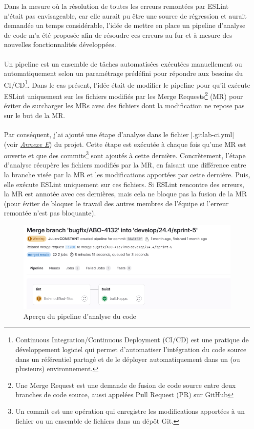 \documentclass[12pt, a4paper]{report}
\begin{document}
	\noindent
	Dans la mesure où la résolution de toutes les erreurs remontées par ESLint n'était pas envisageable, car elle aurait pu être une source de régression et aurait demandée un temps considérable, l'idée de mettre en place un pipeline d'analyse de code m'a été proposée afin de résoudre ces erreurs au fur et à mesure des nouvelles fonctionnalités développées.
	\\\\
	Un pipeline est un ensemble de tâches automatisées exécutées manuellement ou automatiquement selon un paramétrage prédéfini pour répondre aux besoins du CI/CD\footnote{Continuous Integration/Continuous Deployment (CI/CD) est une pratique de développement logiciel qui permet d'automatiser l'intégration du code source dans un référentiel partagé et de le déployer automatiquement dans un (ou plusieurs) environnement.}. Dans le cas présent, l'idée était de modifier le pipeline pour qu'il exécute ESLint uniquement sur les fichiers modifiés par les Merge Requests\footnote{Une Merge Request est une demande de fusion de code source entre deux branches de code source, aussi appelées Pull Request (PR) sur GitHub} (MR) pour éviter de surcharger les MRs avec des fichiers dont la modification ne repose pas sur le but de la MR.
	\\\\
	Par conséquent, j'ai ajouté une étape d'analyse dans le fichier \flqq{} \cverb|.gitlab-ci.yml| \frqq{} (voir \hyperref[sec:ci-cd_gitlab]{\it{Annexe E}}) du projet. Cette étape est exécutée à chaque fois qu'une MR est ouverte et que des commits\footnote{Un commit est une opération qui enregistre les modifications apportées à un fichier ou un ensemble de fichiers dans un dépôt Git.} sont ajoutés à cette dernière. Concrètement, l'étape d'analyse récupère les fichiers modifiés par la MR, en faisant une différence entre la branche visée par la MR et les modifications apportées par cette dernière. Puis,
  elle exécute ESLint uniquement sur ces fichiers. Si ESLint rencontre des erreurs, la MR est annotée avec ces dernières, mais cela ne bloque pas la fusion de la MR (pour éviter de bloquer le travail des autres membres de l'équipe si l'erreur remontée 
	n'est pas bloquante).
	\\
	
	\begin{figure}[!h]
		\centering
		\includegraphics[width=1\textwidth]{assets/images/lint_pipeline.png}
		\vspace{-.6cm}
		\caption{Aperçu du pipeline d'analyse du code}
	\end{figure}
\end{document}
